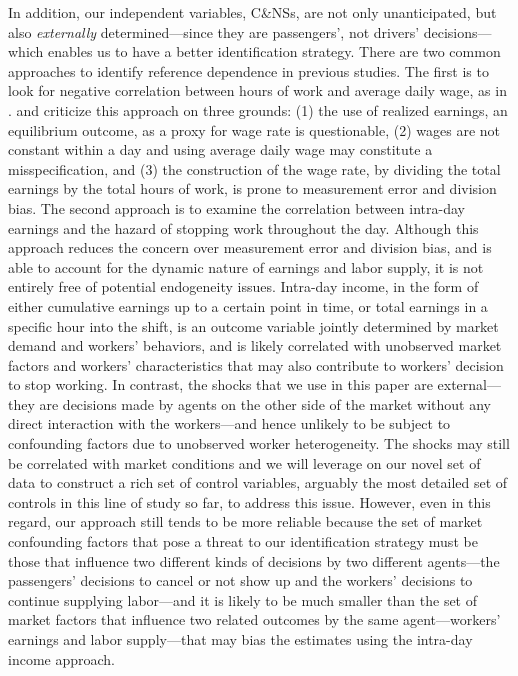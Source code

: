 \documentclass[reviewmode]{restud}
\begin{document}
In addition, our independent variables, C\&NSs, are not only unanticipated, but also \textit{externally} determined---since they are passengers', not drivers' decisions---which enables us to have a better identification strategy.  
There are two common approaches to identify reference dependence in previous studies. The first is to look for negative correlation between hours of work and average daily wage, as in \citet{camerer1997labor}. \citet{oettinger1999empirical} and \citet{farber2005tomorrow} criticize this approach on three grounds: (1) the use of realized earnings, an equilibrium outcome, as a proxy for wage rate is questionable, (2) wages are not constant within a day and using average daily wage may constitute a misspecification, and (3) the construction of the wage rate, by dividing the total earnings by the total hours of work, is prone to measurement error and division bias.
The second approach is to examine the correlation between intra-day earnings and the hazard of stopping work throughout the day. Although this approach reduces the concern over measurement error and division bias, and is able to account for the dynamic nature of earnings and labor supply, it is not entirely free of potential endogeneity issues. Intra-day income, in the form of either cumulative earnings up to a certain point in time, or total earnings in a specific hour into the shift, is an outcome variable jointly determined by market demand and workers' behaviors, and is likely correlated with unobserved market factors and workers' characteristics that may also contribute to workers' decision to stop working. 
In contrast, the shocks that we use in this paper are external---they are decisions made by agents on the other side of the market without any direct interaction with the workers---and hence unlikely to be subject to confounding factors due to unobserved worker heterogeneity. The shocks may still be correlated with market conditions and we will leverage on our novel set of data to construct a rich set of control variables, arguably the most detailed set of controls in this line of study so far, to address this issue. However, even in this regard, our approach still tends to be more reliable because the set of market confounding factors that pose a threat to our identification strategy must be those that influence two different kinds of decisions by two different agents---the passengers' decisions to cancel or not show up and the workers' decisions to continue supplying labor---and it is likely to be much smaller than the set of market factors that influence two related outcomes by the same agent---workers' earnings and labor supply---that may bias the estimates using the intra-day income approach.
\end{document}
